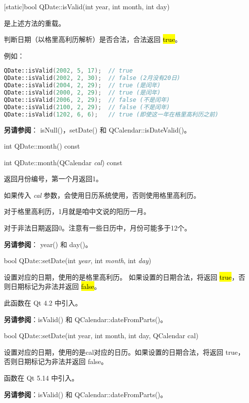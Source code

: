 \splitLine

[static]bool QDate::isValid(int year, int month, int day)

是上述方法的重载。

判断日期（以格里高利历解析）是否合法，合法返回 \hl{true}。

例如：

\begin{lstlisting}[language=C++]
QDate::isValid(2002, 5, 17);  // true
QDate::isValid(2002, 2, 30);  // false (2月没有20日)
QDate::isValid(2004, 2, 29);  // true (是闰年)
QDate::isValid(2000, 2, 29);  // true (是闰年)
QDate::isValid(2006, 2, 29);  // false (不是闰年)
QDate::isValid(2100, 2, 29);  // false (不是闰年)
QDate::isValid(1202, 6, 6);   // true (即使这一年在格里高利历之前)
\end{lstlisting}

\textbf{另请参阅}： isNull()，setDate() 和 QCalendar::isDateValid()。

\splitLine

int QDate::month() const

int QDate::month(QCalendar \emph{cal}) const

返回月份编号，第一个月返回1。

如果传入 \emph{cal} 参数，会使用日历系统使用，否则使用格里高利历。

对于格里高利历，1月就是咱中文说的阳历一月。

对于非法日期返回0。注意有一些日历中，月份可能多于12个。

\textbf{另请参阅}： year() 和 day()。

\splitLine

bool QDate::setDate(int \emph{year}, int  \emph{month}, int \emph{day})

设置对应的日期，使用的是格里高利历。 如果设置的日期合法，将返回
\hl{true}，否则日期标记为非法并返回 \hl{false}。

此函数在 Qt 4.2 中引入。

\textbf{另请参阅}：isValid() 和 QCalendar::dateFromParts()。

\splitLine

bool QDate::setDate(int year, int month, int day, QCalendar cal)

设置对应的日期，使用的是cal对应的日历。如果设置的日期合法，将返回 true，否则日期标记为非法并返回 false。

函数在 Qt 5.14 中引入。

\textbf{另请参阅}：isValid() 和 QCalendar::dateFromParts()。

\splitLine

